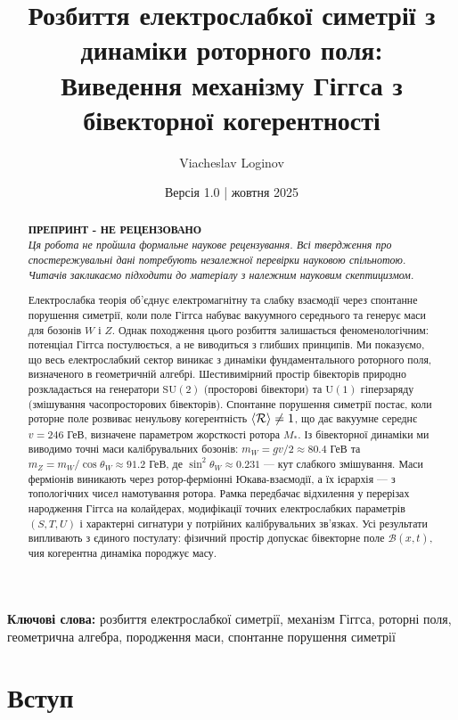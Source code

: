 \documentclass[11pt,a4paper]{article}
\title{\textbf{Розбиття електрослабкої симетрії з динаміки роторного поля: \\
Виведення механізму Гіггса з бівекторної когерентності}}
\author[1]{Viacheslav Loginov}
\affil[1]{Kyiv, Ukraine\\ \texttt{barthez.slavik@gmail.com}}
\date{\small Версія 1.0 \quad|\quad 15 жовтня 2025}
\newcommand{\Rotor}{\mathcal{R}}
\newcommand{\Biv}{\mathcal{B}}
\newcommand{\SU}{\mathrm{SU}}
\newcommand{\UU}{\mathrm{U}}
\theoremstyle{definition}
\theoremstyle{plain}
\theoremstyle{remark}
\begin{document}
\maketitle

\begin{abstract}
\noindent
\textbf{ПРЕПРИНТ - НЕ РЕЦЕНЗОВАНО}\\
\textit{Ця робота не пройшла формальне наукове рецензування. Всі твердження про спостережувальні дані потребують незалежної перевірки науковою спільнотою. Читачів закликаємо підходити до матеріалу з належним науковим скептицизмом.}

\medskip
\noindent\noindent
Електрослабка теорія об’єднує електромагнітну та слабку взаємодії через спонтанне порушення симетрії, коли поле Гіггса набуває вакуумного середнього та генерує маси для бозонів $W$ і $Z$. Однак походження цього розбиття залишається феноменологічним: потенціал Гіггса постулюється, а не виводиться з глибших принципів. Ми показуємо, що весь електрослабкий сектор виникає з динаміки фундаментального роторного поля, визначеного в геометричній алгебрі. Шестивимірний простір бівекторів природно розкладається на генератори $\SU(2)$ (просторові бівектори) та $\UU(1)$ гіперзаряду (змішування часопросторових бівекторів). Спонтанне порушення симетрії постає, коли роторне поле розвиває ненульову когерентність $\ev{\Rotor} \neq 1$, що дає вакуумне середнє $v = 246$ ГеВ, визначене параметром жорсткості ротора $M_\ast$. Із бівекторної динаміки ми виводимо точні маси калібрувальних бозонів: $m_W = gv/2 \approx 80{.}4$ ГеВ та $m_Z = m_W/\cos\theta_W \approx 91{.}2$ ГеВ, де $\sin^2\theta_W \approx 0{.}231$ — кут слабкого змішування. Маси ферміонів виникають через ротор-ферміонні Юкава-взаємодії, а їх ієрархія — з топологічних чисел намотування ротора. Рамка передбачає відхилення у перерізах народження Гіггса на колайдерах, модифікації точних електрослабких параметрів $(S,T,U)$ і характерні сигнатури у потрійних калібрувальних зв’язках. Усі результати випливають з єдиного постулату: фізичний простір допускає бівекторне поле $\Biv(x,t)$, чия когерентна динаміка породжує масу.
\end{abstract}

\noindent\textbf{Ключові слова:} розбиття електрослабкої симетрії, механізм Гіггса, роторні поля, геометрична алгебра, породження маси, спонтанне порушення симетрії

\vspace{1em}

\section{Вступ}
\end{document}
